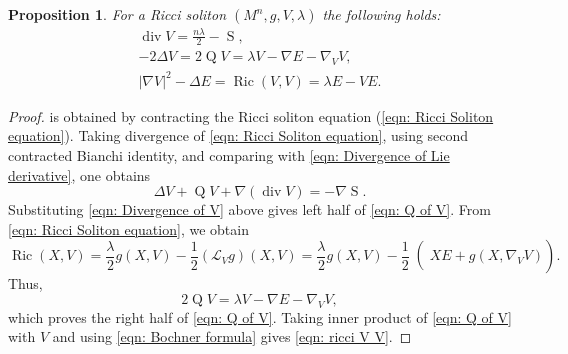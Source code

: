 \documentclass{amsart}
\newcommand{\abs}[1]{\left| #1 \right|}
\newcommand{\lie}[1]{\mathcal{L}_{#1}}
\DeclareMathOperator*{\ricci}{Ric}
\DeclareMathOperator*{\Qricci}{Q}
\DeclareMathOperator*{\scalar}{S}
\DeclareMathOperator*{\divergence}{div}
\theoremstyle{plain}
\newtheorem{proposition}{Proposition}
\theoremstyle{plain}
\theoremstyle{plain}
\theoremstyle{plain}
\theoremstyle{remark}
\begin{document}
\begin{proposition}
    For a Ricci soliton $(M^n,g,V,\lambda)$  the following holds:
    \begin{gather}
        \divergence V = \frac{n\lambda}{2} - \scalar \label{eqn: Divergence of V} , \\
        -2 \Delta V = 2 \Qricci V =  
            \lambda V - \nabla E - \nabla_V V \label{eqn: Q of V} , \\
        \abs{\nabla V }^2 - \Delta E = \ricci(V,V) = \lambda E - V E \label{eqn: ricci V V}.
    \end{gather}
\end{proposition}
\begin{proof}
     is obtained by contracting the Ricci soliton equation (\cref{eqn: Ricci Soliton equation}). 
    Taking divergence of \cref{eqn: Ricci Soliton equation}, using second contracted Bianchi identity, and comparing with \cref{eqn: Divergence of Lie derivative}, one obtains
    \begin{equation*}
        \Delta V  + \Qricci V  + \nabla (\divergence V) = - \nabla\scalar.
    \end{equation*}
    Substituting \cref{eqn: Divergence of V} above gives left half of \cref{eqn: Q of V}. 
    From \cref{eqn: Ricci Soliton equation}, we obtain
    \begin{equation*}
    \ricci (X,V) = \frac{\lambda}{2} g(X,V) - \frac{1}{2} (\lie{V}g)(X,V) 
        = \frac{\lambda}{2} g(X,V) - \left. \frac{1}{2} \middle( X E + g(X,\nabla_V V) \right) .
    \end{equation*}
    Thus, 
    \begin{equation*}
        2 \Qricci V =  \lambda V - \nabla E - \nabla_V V ,
    \end{equation*}
    which proves the right half of \cref{eqn: Q of V}. Taking inner product of \cref{eqn: Q of V} with $V$ and using \cref{eqn: Bochner formula} gives \cref{eqn: ricci V V}.
\end{proof}
\end{document}

